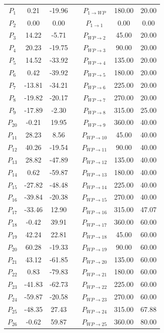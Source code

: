\begin{itemize}
\begin{longtable}{ccc p{8mm} ccc}
            $P_{1}$ & 0.21 & -19.96 & & $P_{1 \rightarrow WP}$ & 180.00 & 20.00 \\
            $P_{2}$ & 0.00 & 0.00 & & $P_{1 \rightarrow 1}$ & 0.00 & 0.00 \\
            $P_{3}$ & 14.22 & -5.71 & & $P_{WP \rightarrow 2}$ & 45.00 & 20.00 \\
            $P_{4}$ & 20.23 & -19.75 & & $P_{WP \rightarrow 3}$ & 90.00 & 20.00 \\
            $P_{5}$ & 14.52 & -33.92 & & $P_{WP \rightarrow 4}$ & 135.00 & 20.00 \\
            $P_{6}$ & 0.42 & -39.92 & & $P_{WP \rightarrow 5}$ & 180.00 & 20.00 \\
            $P_{7}$ & -13.81 & -34.21 & & $P_{WP \rightarrow 6}$ & 225.00 & 20.00 \\
            $P_{8}$ & -19.82 & -20.17 & & $P_{WP \rightarrow 7}$ & 270.00 & 20.00 \\
            $P_{9}$ & -17.89 & -2.30 & & $P_{WP \rightarrow 8}$ & 315.00 & 25.00 \\
            $P_{20}$ & -0.21 & 19.95 & & $P_{WP \rightarrow 9}$ & 360.00 & 40.00 \\
            $P_{11}$ & 28.23 & 8.56 & & $P_{WP \rightarrow 10}$ & 45.00 & 40.00 \\
            $P_{12}$ & 40.26 & -19.54 & & $P_{WP \rightarrow 11}$ & 90.00 & 40.00 \\
            $P_{13}$ & 28.82 & -47.89 & & $P_{WP \rightarrow 12}$ & 135.00 & 40.00 \\
            $P_{14}$ & 0.62 & -59.87 & & $P_{WP \rightarrow 13}$ & 180.00 & 40.00 \\
            $P_{15}$ & -27.82 & -48.48 & & $P_{WP \rightarrow 14}$ & 225.00 & 40.00 \\
            $P_{16}$ & -39.84 & -20.38 & & $P_{WP \rightarrow 15}$ & 270.00 & 40.00 \\
            $P_{17}$ & -33.46 & 12.90 & & $P_{WP \rightarrow 16}$ & 315.00 & 47.07 \\
            $P_{18}$ & -0.42 & 39.91 & & $P_{WP \rightarrow 17}$ & 360.00 & 60.00 \\
            $P_{19}$ & 42.24 & 22.81 & & $P_{WP \rightarrow 18}$ & 45.00 & 60.00 \\
            $P_{20}$ & 60.28 & -19.33 & & $P_{WP \rightarrow 19}$ & 90.00 & 60.00 \\
            $P_{21}$ & 43.12 & -61.85 & & $P_{WP \rightarrow 20}$ & 135.00 & 60.00 \\
            $P_{22}$ & 0.83 & -79.83 & & $P_{WP \rightarrow 21}$ & 180.00 & 60.00 \\
            $P_{23}$ & -41.83 & -62.73 & & $P_{WP \rightarrow 22}$ & 225.00 & 60.00 \\
            $P_{24}$ & -59.87 & -20.58 & & $P_{WP \rightarrow 23}$ & 270.00 & 60.00 \\
            $P_{25}$ & -48.35 & 27.43 & & $P_{WP \rightarrow 24}$ & 315.00 & 67.88 \\
            $P_{26}$ & -0.62 & 59.87 & & $P_{WP \rightarrow 25}$ & 360.00 & 80.00 \\


\end{longtable}
\end{itemize}
